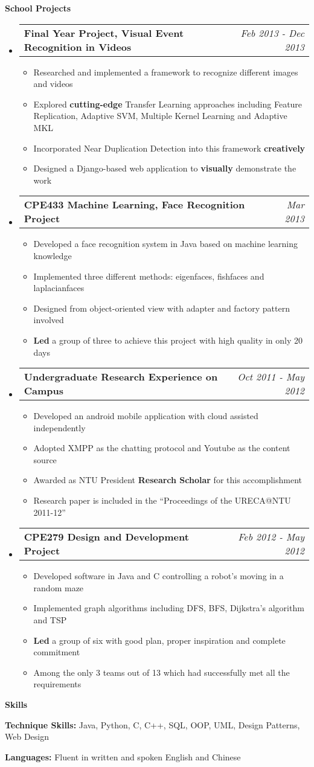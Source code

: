 \documentclass[a4paper,12pt]{article}
\makeatletter
\newcommand{\resitem}[1]{\item #1 \vspace{-2pt}}
\newcommand{\resheading}[1]{{\large {\begin{minipage}{\textwidth}{\textbf{#1 \vphantom{p\^{E}}}}\end{minipage}}}}
\newcommand{\projectsubheading}[2]{
\begin{tabular*}{6.3in}{l@{\extracolsep{\fill}}r}
		\textbf{#1} & \textit{#2} \\
\end{tabular*}\vspace{-6pt}}
\makeatother
\begin{document}
\resheading {School Projects}
\begin{itemize}
\item
	\projectsubheading {Final Year Project, Visual Event Recognition in Videos}{Feb 2013 - Dec 2013}
	\begin{itemize}
		\resitem {Researched and implemented a framework to recognize different images and videos}
		\resitem {Explored \textbf{cutting-edge} Transfer Learning approaches including Feature Replication, Adaptive SVM, Multiple Kernel Learning and Adaptive MKL}
		\resitem {Incorporated Near Duplication Detection into this framework \textbf{creatively}}

		\resitem {Designed a Django-based web application to \textbf{visually} demonstrate the work}

	\end{itemize}

\item
	\projectsubheading {CPE433 Machine Learning, Face Recognition Project}{Mar 2013}
	\begin{itemize}
		\resitem {Developed a face recognition system in Java based on machine learning knowledge}
		\resitem {Implemented three different methods: eigenfaces, fishfaces and laplacianfaces}
		\resitem {Designed from object-oriented view with adapter and factory pattern involved}
		\resitem {\textbf{Led} a group of three to achieve this project with high quality in only 20 days}
	\end{itemize}
\item
	\projectsubheading {Undergraduate Research Experience on Campus} {Oct 2011 - May 2012}

	\begin{itemize}
		\resitem {Developed an android mobile application with cloud assisted independently}
		\resitem {Adopted XMPP as the chatting protocol and Youtube as the content source}
		\resitem {Awarded as NTU President \textbf{Research Scholar} for this accomplishment}
		\resitem{ Research paper is included in the ``Proceedings of the URECA@NTU 2011-12''}
	\end{itemize}
\item
	\projectsubheading {CPE279 Design and Development Project}{Feb 2012 - May 2012}

	\begin{itemize}
		\resitem {Developed software in Java and C controlling a robot's moving in a random maze}
		\resitem {Implemented graph algorithms including DFS, BFS, Dijkstra's algorithm and TSP}
		\resitem {\textbf{Led} a group of six with good plan, proper inspiration and complete commitment}
		\resitem {Among the only 3 teams out of 13 which had successfully met all the requirements}
	\end{itemize}
\end{itemize}

\resheading{Skills}
\begin{description}
\item{\bf Technique Skills: }Java, Python, C, C++, SQL, OOP, UML, Design Patterns, Web Design

\item{\bf Languages: }Fluent in written and spoken English and Chinese
\end{description}
\end{document}
